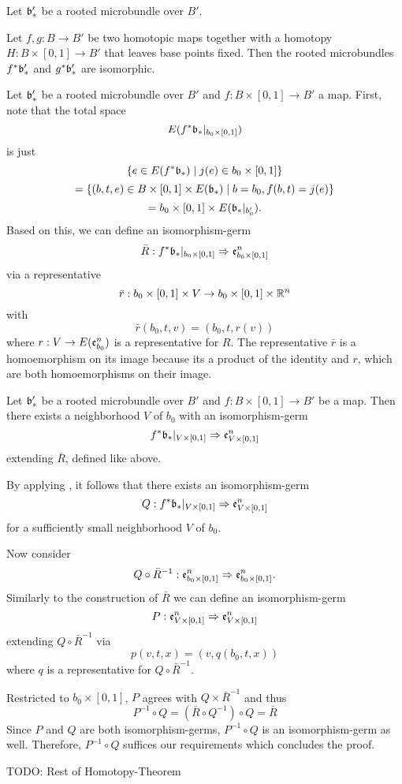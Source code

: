 Let $\mathfrak{b}'_*$ be a rooted microbundle over $B'$.
\begin{mytheorem}\label{suspension::homotopy}%
    Let $f, g: B \to B'$ be two homotopic maps together with a homotopy $H: B \times [0, 1] \to B'$
    that leaves base points fixed.
    Then the rooted microbundles $f^*\mathfrak{b}'_*$ and $g^*\mathfrak{b}'_*$ are isomorphic.
\end{mytheorem}

\begin{myparagraph}
    Let $\mathfrak{b}'_*$ be a rooted microbundle over $B'$ and $f: B \times [0, 1] \to B'$ a map. 
    First, note that the total space
    \[ E(f^*\mathfrak{b}_*\vert_{b_0 \times [0, 1]}) \]
    is just
    \[ \{ e \in E(f^*\mathfrak{b}_*) \mid j(e) \in b_0 \times [0, 1] \} \]
    \[ = \{ (b, t, e) \in B \times [0, 1] \times E(\mathfrak{b}_*) \mid b = b_0, f(b, t) = j(e) \} \]
    \[ = b_0 \times [0, 1] \times E(\mathfrak{b}_*\vert_{b_0'}). \]
    Based on this, we can define an isomorphism-germ
    \[ \bar{R}: f^*\mathfrak{b}_*\vert_{b_0 \times [0, 1]} \Rightarrow \mathfrak{e}^n_{b_0 \times [0, 1]} \]
    via a representative
    \[ \bar{r}: b_0 \times [0, 1] \times V \to b_0 \times [0, 1] \times \mathbb{R}^n \]
    with
    \[ \bar{r}(b_0, t, v) = (b_0, t, r(v) )\]
    where $r: V \to E(\mathfrak{e}^n_{b_0})$ is a representative for $R$.
    The representative $\bar{r}$ is a homoemorphism on its image
    because its a product of the identity and $r$, which are both homoemorphisms on their image. 
\end{myparagraph}
\begin{mylemma}
    Let $\mathfrak{b}'_*$ be a rooted microbundle over $B'$ and $f: B \times [0, 1] \to B'$ be a map.
    Then there exists a neighborhood $V$ of $b_0$ with an isomorphism-germ
    \[ f^*\mathfrak{b}_*\vert_{V \times [0, 1]} \Rightarrow \mathfrak{e}^n_{V \times [0, 1]} \]
    extending $\bar{R}$, defined like above.
\end{mylemma}
\begin{myproof}
    By applying , it follows that there exists an isomorphism-germ
    \[ Q: f^*\mathfrak{b}_*\vert_{V \times [0, 1]} \Rightarrow \mathfrak{e}^n_{V \times [0, 1]} \]
    for a sufficiently small neighborhood $V$ of $b_0$.

    Now consider
    \[ Q \circ \bar{R}^{-1}: \mathfrak{e}^n_{b_0 \times [0, 1]} \Rightarrow \mathfrak{e}^n_{b_0 \times [0, 1]}. \]
    Similarly to the construction of $\bar{R}$ we can define an isomorphism-germ
    \[ P: \mathfrak{e}^n_{V \times [0, 1]} \Rightarrow \mathfrak{e}^n_{V \times [0, 1]} \]
    extending $Q \circ \bar{R}^{-1}$ via
    \[ p(v, t, x) = (v, q(b_0, t, x)) \]
    where $q$ is a representative for $Q \circ \bar{R}^{-1}$.

    Restricted to $b_0 \times [0, 1]$, $P$ agrees with $Q \times \bar{R}^{-1}$ and thus
    \[ P^{-1} \circ Q = (\bar{R} \circ Q^{-1}) \circ Q = \bar{R} \]
    Since $P$ and $Q$ are both isomorphism-germs, $P^{-1} \circ Q$ is an isomorphism-germ as well.
    Therefore, $P^{-1} \circ Q$ suffices our requirements which concludes the proof.
\end{myproof}
TODO: Rest of Homotopy-Theorem